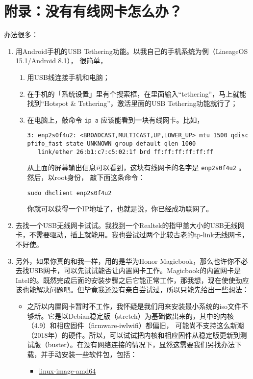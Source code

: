 \documentclass{wx672ctexart}
\begin{document}
\section{附录：没有有线网卡怎么办？}
\label{sec:org3378f41}
办法很多：
\begin{enumerate}
\item 用Android手机的USB Tethering功能。以我自己的手机系统为例（LineageOS 15.1/Android 8.1），
很简单，
\begin{enumerate}
\item 用USB线连接手机和电脑；
\item 在手机的「系统设置」里有个搜索框，在里面输入“tethering”，马上就能找到“Hotspot \&
Tethering”，激活里面的USB Tethering功能就行了；
\item 在电脑上，敲命令 \texttt{ip a} 应该能看到一块有线网卡。比如，
\begin{verbatim}
3: enp2s0f4u2: <BROADCAST,MULTICAST,UP,LOWER_UP> mtu 1500 qdisc pfifo_fast state UNKNOWN group default qlen 1000
   link/ether 26:b1:c7:c5:02:1f brd ff:ff:ff:ff:ff:ff
\end{verbatim}
从上面的屏幕输出信息可以看到，这块有线网卡的名字是 \texttt{enp2s0f4u2} 。然后，以root身份，
敲下面这条命令：
\begin{verbatim}
sudo dhclient enp2s0f4u2
\end{verbatim}
你就可以获得一个IP地址了，也就是说，你已经成功联网了。
\end{enumerate}
\item 去找一个USB无线网卡试试。我找到一个Realtek的指甲盖大小的USB无线网卡，不需要驱动，插上就能用。我也尝试过两个比较古老的tp-link无线网卡，不好使。
\item 另外，如果你真的和我一样，用的是华为Honor Magicbook，那么也许你不必去找USB网卡，可以先试试能否让内置网卡工作。Magicbook的内置网卡是Intel的。既然完成后面的安装步骤之后它能正常工作，那我想，现在使使劲应该也能解决问题吧。但毕竟我还没有亲自尝试过，所以只能先给出一些想法：
\begin{itemize}
\item 之所以内置网卡暂时不工作，我怀疑是我们用来安装最小系统的iso文件不够新。它是以Debian稳定版（stretch）为基础做出来的，其中的内核（4.9）和相应固件（firmware-iwlwifi）都偏旧，
可能尚不支持这么新潮（2018年）的硬件。所以，可以试试把内核和相应固件从稳定版更新到测试版（buster）。在没有网络连接的情况下，显然这需要我们另找办法下载，并手动安装一些软件包，包括：
\begin{itemize}
\item \href{https://packages.debian.org/buster/linux-image-amd64}{linux-image-amd64}

\end{itemize}
\end{itemize}
\end{enumerate}
\end{document}
